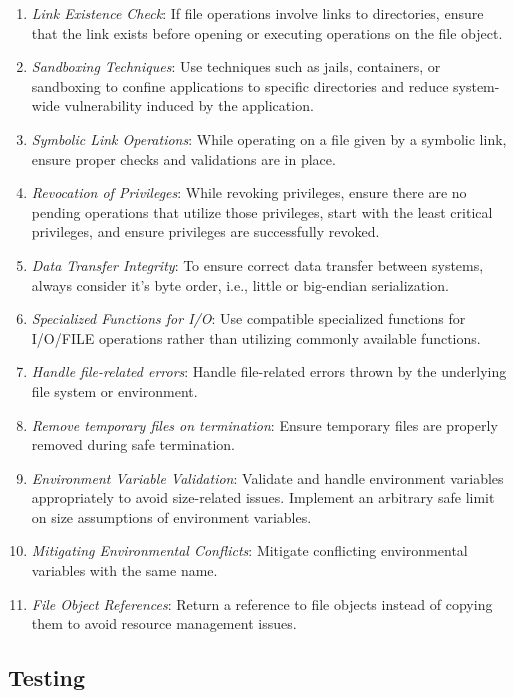 \documentclass[9pt]{IEEEtran} %
\begin{document}
\begin{enumerate}
  \item \textit{Link Existence Check}: If file operations involve links to directories, ensure that the link exists before opening or executing operations on the file object.
  \item \textit{Sandboxing Techniques}: Use techniques such as jails, containers, or sandboxing to confine applications to specific directories and reduce system-wide vulnerability induced by the application.
  \item \textit{Symbolic Link Operations}: While operating on a file given by a symbolic link, ensure proper checks and validations are in place. 
  \item \textit{Revocation of Privileges}: While revoking privileges, ensure there are no pending operations that utilize those privileges, start with the least critical privileges, and ensure privileges are successfully revoked.
  \item \textit{Data Transfer Integrity}: To ensure correct data transfer between systems, always consider it's byte order, i.e., little or big-endian serialization.
  \item \textit{Specialized Functions for I/O}: Use compatible specialized functions for I/O/FILE operations rather than utilizing commonly available functions.
  \item \textit{Handle file-related errors}: Handle file-related errors thrown by the underlying file system or environment.
  \item \textit{Remove temporary files on termination}: Ensure temporary files are properly removed during safe termination.
  \item \textit{Environment Variable Validation}: Validate and handle environment variables appropriately to avoid size-related issues. Implement an arbitrary safe limit on size assumptions of environment variables.
  \item \textit{Mitigating Environmental Conflicts}: Mitigate conflicting environmental variables with the same name.
  \item \textit{File Object References}: Return a reference to file objects instead of copying them to avoid resource management issues.
\end{enumerate}

\subsection{Testing}
\label{ESSTesting}
\end{document}
